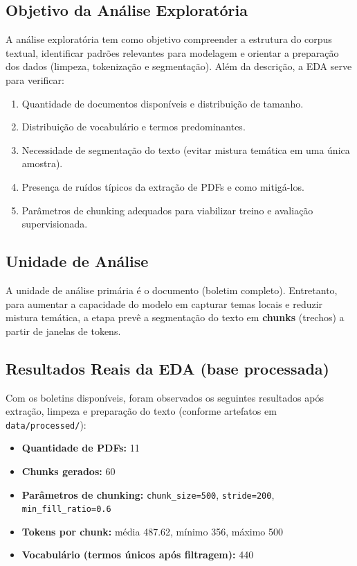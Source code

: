 \subsection{Objetivo da Análise Exploratória}

A análise exploratória tem como objetivo compreender a estrutura do corpus textual, identificar padrões relevantes para modelagem e orientar a preparação dos dados (limpeza, tokenização e segmentação). Além da descrição, a EDA serve para verificar:

\begin{enumerate}[leftmargin=1.2cm]
    \item Quantidade de documentos disponíveis e distribuição de tamanho.
    \item Distribuição de vocabulário e termos predominantes.
    \item Necessidade de segmentação do texto (evitar mistura temática em uma única amostra).
    \item Presença de ruídos típicos da extração de PDFs e como mitigá-los.
    \item Parâmetros de chunking adequados para viabilizar treino e avaliação supervisionada.
\end{enumerate}

\subsection{Unidade de Análise}

A unidade de análise primária é o documento (boletim completo). Entretanto, para aumentar a capacidade do modelo em capturar temas locais e reduzir mistura temática, a etapa prevê a segmentação do texto em \textbf{chunks} (trechos) a partir de janelas de tokens.

\subsection{Resultados Reais da EDA (base processada)}

Com os boletins disponíveis, foram observados os seguintes resultados após extração, limpeza e preparação do texto (conforme artefatos em \texttt{data/processed/}):

\begin{itemize}[leftmargin=1.2cm]
    \item \textbf{Quantidade de PDFs:} 11
    \item \textbf{Chunks gerados:} 60
    \item \textbf{Parâmetros de chunking:} \texttt{chunk\_size=500}, \texttt{stride=200}, \texttt{min\_fill\_ratio=0.6}
    \item \textbf{Tokens por chunk:} média 487.62, mínimo 356, máximo 500
    \item \textbf{Vocabulário (termos únicos após filtragem):} 440
\end{itemize}

